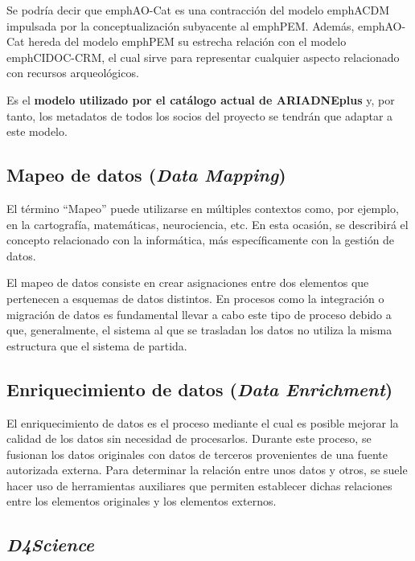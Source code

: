 Se podría decir que emph{AO-Cat} es una
contracción del modelo emph{ACDM} impulsada por la conceptualización
subyacente al emph{PEM}. Además, emph{AO-Cat} hereda del modelo emph{PEM} su estrecha
relación con el modelo emph{CIDOC-CRM}, el cual sirve para representar
cualquier aspecto relacionado con recursos arqueológicos.

Es el \textbf{modelo utilizado por el catálogo actual de ARIADNEplus} y,
por tanto, los metadatos de todos los socios del proyecto se tendrán que adaptar a este
modelo.

\subsection{Mapeo de datos (\emph{Data Mapping})}

El término ``Mapeo'' puede utilizarse en múltiples contextos como, por
ejemplo, en la cartografía, matemáticas, neurociencia, etc. En esta
ocasión, se describirá el concepto relacionado con la informática, más
específicamente con la gestión de datos.

El mapeo de datos consiste en crear asignaciones entre dos elementos que
pertenecen a esquemas de datos distintos. En procesos como la
integración o migración de datos es fundamental llevar a cabo este tipo
de proceso debido a que, generalmente, el sistema al que se trasladan
los datos no utiliza la misma estructura que el sistema de partida.


\subsection{Enriquecimiento de datos (\emph{Data Enrichment})}

El enriquecimiento de datos es el proceso mediante el cual es posible
mejorar la calidad de los datos sin necesidad de procesarlos. Durante
este proceso, se fusionan los datos originales con datos de terceros
provenientes de una fuente autorizada externa. Para
determinar la relación entre unos datos y otros, se suele hacer uso de
herramientas auxiliares que permiten establecer dichas relaciones entre
los elementos originales y los elementos externos.


\subsection{\emph{D4Science}}

